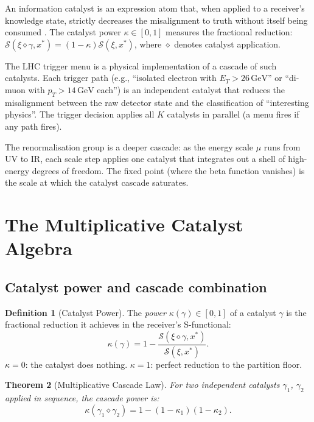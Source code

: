 \documentclass[twocolumn,10pt,a4paper]{article}
\theoremstyle{thmstyle}
\newtheorem{theorem}{Theorem}[section]
\theoremstyle{definition}
\newtheorem{definition}[theorem]{Definition}
\theoremstyle{remark}
\newcommand{\catpow}{\kappa}
\begin{document}
An information catalyst is an expression atom that, when applied to a
receiver's knowledge state, strictly decreases the misalignment to truth
without itself being consumed \citep{companion:trajectory}.
The catalyst power $\catpow \in [0,1]$ measures the fractional reduction:
$\mathcal{S}(\xi\diamond\gamma, x^*) = (1-\catpow)\mathcal{S}(\xi, x^*)$,
where $\diamond$ denotes catalyst application.

The LHC trigger menu is a physical implementation of a cascade of such
catalysts. Each trigger path (e.g., ``isolated electron with $E_T > 26\,\mathrm{GeV}$''
or ``di-muon with $p_T > 14\,\mathrm{GeV}$ each'') is an independent
catalyst that reduces the misalignment between the raw detector state
and the classification of ``interesting physics''. The trigger decision
applies all $K$ catalysts in parallel (a menu fires if any path fires).

The renormalisation group is a deeper cascade: as the energy scale $\mu$
runs from UV to IR, each scale step applies one catalyst that integrates
out a shell of high-energy degrees of freedom. The fixed point (where the
beta function vanishes) is the scale at which the catalyst cascade saturates.

\section{The Multiplicative Catalyst Algebra}
\label{sec:algebra}

\subsection{Catalyst power and cascade combination}

\begin{definition}[Catalyst Power]
\label{def:catpow}
The \emph{power} $\catpow(\gamma) \in [0,1]$ of a catalyst $\gamma$ is the
fractional reduction it achieves in the receiver's S-functional:
\begin{equation}
\catpow(\gamma) = 1 - \frac{\mathcal{S}(\xi\diamond\gamma, x^*)}{\mathcal{S}(\xi, x^*)}.
\label{eq:catpow}
\end{equation}
$\catpow = 0$: the catalyst does nothing. $\catpow = 1$: perfect reduction
to the partition floor.
\end{definition}

\begin{theorem}[Multiplicative Cascade Law]
\label{thm:cascade_power}
For two independent catalysts $\gamma_1$, $\gamma_2$ applied in sequence,
the cascade power is:
\begin{equation}
\catpow(\gamma_1\diamond\gamma_2) = 1 - (1-\catpow_1)(1-\catpow_2).
\label{eq:cascade}
\end{equation}
\end{theorem}
\end{document}
